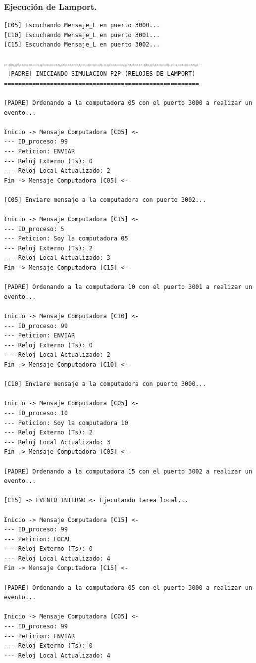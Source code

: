 \subsubsection{Ejecución de Lamport.}

\begin{lstlisting}[style=estiloC]
[C05] Escuchando Mensaje_L en puerto 3000...
[C10] Escuchando Mensaje_L en puerto 3001...
[C15] Escuchando Mensaje_L en puerto 3002...

=======================================================
 [PADRE] INICIANDO SIMULACION P2P (RELOJES DE LAMPORT) 
=======================================================

[PADRE] Ordenando a la computadora 05 con el puerto 3000 a realizar un evento...

Inicio -> Mensaje Computadora [C05] <-
--- ID_proceso: 99
--- Peticion: ENVIAR
--- Reloj Externo (Ts): 0
--- Reloj Local Actualizado: 2
Fin -> Mensaje Computadora [C05] <-

[C05] Enviare mensaje a la computadora con puerto 3002...

Inicio -> Mensaje Computadora [C15] <-
--- ID_proceso: 5
--- Peticion: Soy la computadora 05
--- Reloj Externo (Ts): 2
--- Reloj Local Actualizado: 3
Fin -> Mensaje Computadora [C15] <-

[PADRE] Ordenando a la computadora 10 con el puerto 3001 a realizar un evento...

Inicio -> Mensaje Computadora [C10] <-
--- ID_proceso: 99
--- Peticion: ENVIAR
--- Reloj Externo (Ts): 0
--- Reloj Local Actualizado: 2
Fin -> Mensaje Computadora [C10] <-

[C10] Enviare mensaje a la computadora con puerto 3000...

Inicio -> Mensaje Computadora [C05] <-
--- ID_proceso: 10
--- Peticion: Soy la computadora 10
--- Reloj Externo (Ts): 2
--- Reloj Local Actualizado: 3
Fin -> Mensaje Computadora [C05] <-

[PADRE] Ordenando a la computadora 15 con el puerto 3002 a realizar un evento...

[C15] -> EVENTO INTERNO <- Ejecutando tarea local...

Inicio -> Mensaje Computadora [C15] <-
--- ID_proceso: 99
--- Peticion: LOCAL
--- Reloj Externo (Ts): 0
--- Reloj Local Actualizado: 4
Fin -> Mensaje Computadora [C15] <-

[PADRE] Ordenando a la computadora 05 con el puerto 3000 a realizar un evento...

Inicio -> Mensaje Computadora [C05] <-
--- ID_proceso: 99
--- Peticion: ENVIAR
--- Reloj Externo (Ts): 0
--- Reloj Local Actualizado: 4


\end{lstlisting}

